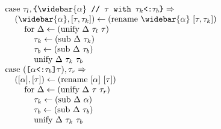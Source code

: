 \documentclass[acmsmall]{acmart}
\begin{document}
\begin{figure*}[h]
\[\begin{array}[t]{@{} l}
    \\

    \I \text{case } \tau_l, \code{\{$\widebar{\alpha}$ // $\tau$ with $\tau_k$<:$\tau_b$\}} \Rightarrow 
    \\
    \I\I (\widebar{\alpha}, [\tau, \tau_k]) \leftarrow (\text{rename } \widebar{\alpha}\ [\tau, \tau_k])
    \\
    \I\I\I \text{for } \Delta \leftarrow (\text{unify } \Delta\ \tau_l\ \tau) 
    \\
    \I\I\I\I \tau_k \leftarrow (\text{sub } \Delta\ \tau_k)
    \\
    \I\I\I\I \tau_b \leftarrow (\text{sub } \Delta\ \tau_b)
    \\
    \I\I\I\I \text{unify } \Delta\ \tau_k\ \tau_b

    \\

    \I \text{case } (\code{[$\alpha$<:$\tau_b$]$\tau$}), \tau_r \Rightarrow 
    \\
    \I\I ([\alpha], [\tau]) \leftarrow (\text{rename } [\alpha]\ [\tau])
    \\
    \I\I\I \text{for } \Delta \leftarrow (\text{unify } \Delta\ \tau\ \tau_r)
    \\
    \I\I\I\I \tau_k \leftarrow (\text{sub } \Delta\ \alpha)
    \\
    \I\I\I\I \tau_b \leftarrow (\text{sub } \Delta\ \tau_b)
    \\
    \I\I\I\I \text{unify } \Delta\ \tau_k\ \tau_b




\end{array}\]
\end{figure*}
\end{document}
